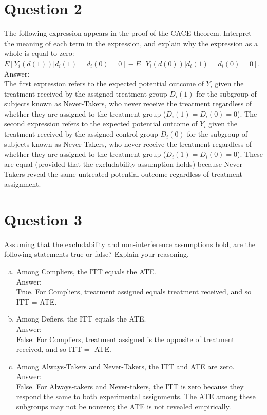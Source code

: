 \documentclass[11pt,notitlepage]{article}\usepackage[]{graphicx}\usepackage[]{color}
\begin{document}
\section*{Question 2}
The following expression appears in the proof of the CACE theorem. Interpret the meaning of each term in the expression, and explain why the expression as a whole is equal to zero: $E[Y_i(d(1))|d_i(1) = d_i(0) = 0] - E[Y_i(d(0))|d_i(1) = d_i(0) = 0]$.\\
Answer:\\
The first expression refers to the expected potential outcome of $Y_i$ given the treatment received by the assigned treatment group $D_i (1)$ for the subgroup of subjects known as Never-Takers, who never receive the treatment regardless of whether they are assigned to the treatment group ($D_i (1)=D_i (0)=0$). The second expression refers to the expected potential outcome of $Y_i$ given the treatment received by the assigned control group $D_i (0)$ for the subgroup of subjects known as Never-Takers, who never receive the treatment regardless of whether they are assigned to the treatment group ($D_i (1)=D_i (0)=0$). These are equal (provided that the excludability assumption holds) because Never-Takers reveal the same untreated potential outcome regardless of treatment assignment.

\section*{Question 3}
Assuming that the excludability and non-interference assumptions hold, are the following statements true or false? Explain your reasoning.
\begin{enumerate}[a)]
\item Among Compliers, the ITT equals the ATE. \\
Answer:\\
True. For Compliers, treatment assigned equals treatment received, and so ITT = ATE.
\item Among Defiers, the ITT equals the ATE.\\
Answer:\\
False:  For Compliers, treatment assigned is the opposite of treatment received, and so ITT = -ATE.
\item Among Always-Takers and Never-Takers, the ITT and ATE are zero.\\
Answer: \\
False. For Always-takers and Never-takers, the ITT is zero because they respond the same to both experimental assignments. The ATE among these subgroups may not be nonzero; the ATE is not revealed empirically.
\end{enumerate}
\end{document}
